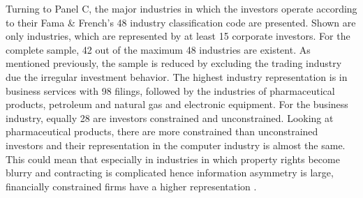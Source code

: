 \documentclass[12pt]{article}
\begin{document}
Turning to Panel C, the major industries in which the investors operate according to their Fama \& French's 48 industry classification code are presented. Shown are only industries, which are represented by at least 15 corporate investors. For the complete sample, 42 out of the maximum 48 industries are existent. As mentioned previously, the sample is reduced by excluding the trading industry due the irregular investment behavior. The highest industry representation is in business services with 98 filings, followed by the industries of pharmaceutical products, petroleum and natural gas and electronic equipment. For the business industry, equally 28 are investors constrained and unconstrained. Looking at pharmaceutical products, there are more constrained than unconstrained investors and their representation in the computer industry is almost the same. This could mean that especially in industries in which property rights become blurry and contracting is complicated hence information asymmetry is large, financially constrained firms have a higher representation \citep[p.4]{Liao2014}.
\end{document}
